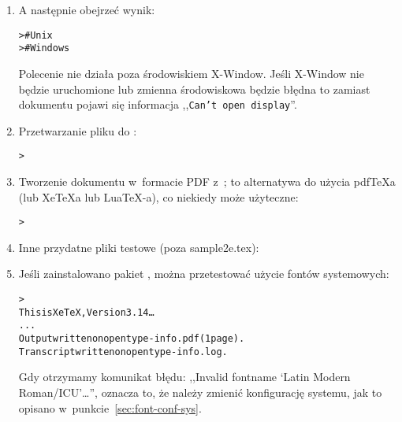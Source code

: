 \documentclass{article}
\renewcommand{\samp}[1]{,,\texttt{#1}''}  %
\begin{document}
\begin{enumerate}
\item A następnie  obejrzeć wynik:
\begin{alltt}
>     # Unix
>   # Windows
\end{alltt}

Polecenie  nie działa poza środowiskiem
X-Window. Jeśli X-Window nie będzie uruchomione lub zmienna
środowiskowa   będzie błędna to zamiast
dokumentu pojawi się informacja \samp{Can't open display}.

\item Przetwarzanie pliku \dvi{} do \PS{}:
\begin{alltt}
> 
\end{alltt}

\item Tworzenie dokumentu  w~formacie PDF z~\dvi{}; to alternatywa
do użycia pdf\TeX\-a (lub Xe\TeX\-a lub Lua\TeX-a), co niekiedy może użyteczne:

\begin{alltt}
> 
\end{alltt}

\item Inne przydatne pliki testowe (poza sample2e.tex):

\item Jeśli zainstalowano pakiet , można przetestować
 użycie fontów systemowych:
\begin{alltt}
> 
This is XeTeX, Version 3.14\dots
...
Output written on opentype-info.pdf (1 page).
Transcript written on opentype-info.log.
\end{alltt}

Gdy otrzymamy komunikat błędu:
,,Invalid fontname `Latin Modern Roman/ICU'\dots'', oznacza to, że
należy zmienić konfigurację systemu, jak to opisano
w~punkcie~\ref{sec:font-conf-sys}.
\end{enumerate}
\end{document}
